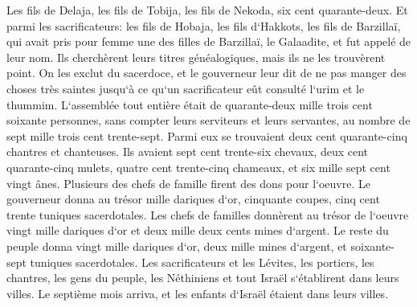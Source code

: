 \verse Les fils de Delaja, les fils de Tobija, les fils de Nekoda, six cent quarante-deux. 
\verse Et parmi les sacrificateurs: les fils de Hobaja, les fils d`Hakkots, les fils de Barzillaï, qui avait pris pour femme une des filles de Barzillaï, le Galaadite, et fut appelé de leur nom. 
\verse Ils cherchèrent leurs titres généalogiques, mais ils ne les trouvèrent point. On les exclut du sacerdoce, 
\verse et le gouverneur leur dit de ne pas manger des choses très saintes jusqu`à ce qu`un sacrificateur eût consulté l`urim et le thummim. 
\verse L`assemblée tout entière était de quarante-deux mille trois cent soixante personnes, 
\verse sans compter leurs serviteurs et leurs servantes, au nombre de sept mille trois cent trente-sept. Parmi eux se trouvaient deux cent quarante-cinq chantres et chanteuses. 
\verse Ils avaient sept cent trente-six chevaux, deux cent quarante-cinq mulets, 
\verse quatre cent trente-cinq chameaux, et six mille sept cent vingt ânes. 
\verse Plusieurs des chefs de famille firent des dons pour l`oeuvre. Le gouverneur donna au trésor mille dariques d`or, cinquante coupes, cinq cent trente tuniques sacerdotales. 
\verse Les chefs de familles donnèrent au trésor de l`oeuvre vingt mille dariques d`or et deux mille deux cents mines d`argent. 
\verse Le reste du peuple donna vingt mille dariques d`or, deux mille mines d`argent, et soixante-sept tuniques sacerdotales. 
\verse Les sacrificateurs et les Lévites, les portiers, les chantres, les gens du peuple, les Néthiniens et tout Israël s`établirent dans leurs villes. Le septième mois arriva, et les enfants d`Israël étaient dans leurs villes. 

